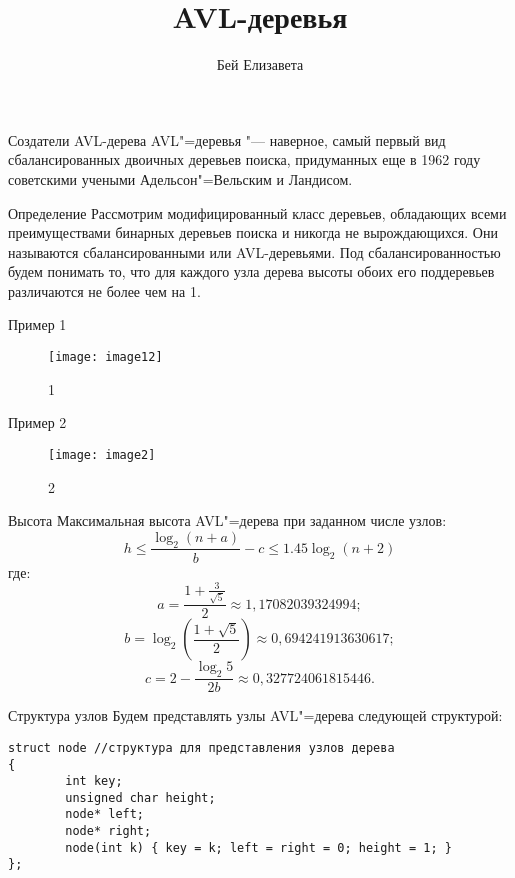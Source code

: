 \documentclass{beamer}
\title{AVL-деревья}
\author{Бей Елизавета}
\institute{Саратовский национальный исследовательский государственный университет имени Н. Г. Чернышевского}
\date{}
\begin{document}
\frame{\titlepage}

\begin{frame}{Создатели AVL-дерева}
    AVL"=деревья "--- наверное, самый первый вид сбалансированных двоичных
    деревьев поиска, придуманных еще в 1962 году советскими учеными
    Адельсон"=Вельским и Ландисом.
\end{frame}

\begin{frame}{Определение}
    Рассмотрим модифицированный класс деревьев, обладающих
    всеми преимуществами бинарных деревьев поиска и никогда не вырождающихся.
    Они называются сбалансированными или AVL-деревьями. Под сбалансированностью
    будем понимать то, что для каждого узла дерева высоты обоих его поддеревьев
    различаются не более чем на 1.
\end{frame}

\begin{frame}{Пример 1}
    \begin{figure}
        \texttt{[image: image12]}
        \caption{1}
    \end{figure}

\end{frame}

\begin{frame}{Пример 2}
    \begin{figure}
        \texttt{[image: image2]}
        \caption{2}
    \end{figure}
\end{frame}

\begin{frame}{Высота}
    Максимальная высота AVL"=дерева при заданном числе узлов:
    \begin{equation}
        h \leqslant \frac{\log_{2}{(n + a)}}{b} - c \leqslant 1.45\log_{2}{(n + 2)}
    \end{equation}
    где: \[a = \frac{1 + \frac{3}{\sqrt{5} }}{2} \approx 1,17082039324994;\]
    \[ b = \log_{2}{(\frac{1 + \sqrt{5}}{2})} \approx 0,694241913630617;\]
    \[c = 2 - \frac{\log_{2}{5}}{2b} \approx 0,327724061815446.\]
\end{frame}

\begin{frame}[fragile]{Структура узлов}
    Будем представлять узлы AVL"=дерева следующей структурой:
    \begin{verbatim}
struct node //структура для представления узлов дерева
{
	    int key;
	    unsigned char height;
	    node* left;
	    node* right;
	    node(int k) { key = k; left = right = 0; height = 1; }
};
    \end{verbatim}
\end{frame}
\end{document}
